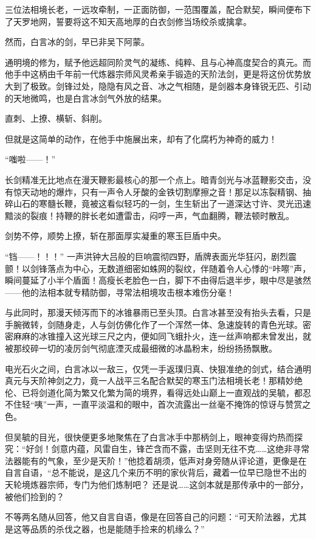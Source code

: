 三位法相境长老，一远攻牵制，一正面防御，一范围覆盖，配合默契，瞬间便布下了天罗地网，誓要将这不知天高地厚的白衣剑修当场绞杀或擒拿。

然而，白言冰的剑，早已非吴下阿蒙。

通明境的修为，赋予他远超同阶灵气的凝练、纯粹、且与心神高度契合的真元。而他手中这柄由千年前一代炼器宗师风灵希亲手锻造的天阶法剑，更是将这份优势放大到了极致。剑锋过处，隐隐有风之音、冰之气相随，是剑器本身锋锐无匹、引动的天地微鸣，也是白言冰剑气外放的结果。

直刺、上撩、横斩、斜削。

但就是这简单的动作，在他手中施展出来，却有了化腐朽为神奇的威力！

“嗤啦——！”

长剑精准无比地点在漫天鞭影最核心的那一个点上。暗青剑光与冰蓝鞭影交击，没有惊天动地的爆炸，只有一声令人牙酸的金铁切割摩擦之音！那足以冻裂精钢、抽碎山石的寒髓长鞭，竟被这看似轻巧的一剑，生生斩出了一道深达寸许、灵光迅速黯淡的裂痕！持鞭的胖长老如遭雷击，闷哼一声，气血翻腾，鞭法顿时散乱。

剑势不停，顺势上撩，斩在那面厚实凝重的寒玉巨盾中央。

“铛——！！！” 一声洪钟大吕般的巨响震彻四野，盾牌表面光华狂闪，剧烈震颤！以剑锋落点为中心，无数道细密如蛛网的裂纹，伴随着令人心悸的“咔嚓”声，瞬间蔓延了小半个盾面！高瘦长老脸色一白，脚下不由得后退半步，眼中尽是骇然——他的法相本就专精防御，寻常法相境攻击根本难伤分毫！

与此同时，那漫天倾泻而下的冰锥暴雨已至头顶。白言冰甚至没有抬头去看，只是手腕微转，剑随身走，人与剑仿佛化作了一个浑然一体、急速旋转的青色光球。密密麻麻的冰锥撞入这光球三尺之内，便如同飞蛾扑火，连一丝声响都未曾发出，就被那绞碎一切的凌厉剑气彻底湮灭成最细微的冰晶粉末，纷纷扬扬飘散。

电光石火之间，白言冰以一敌三，仅凭一手返璞归真、快狠准绝的剑式，结合通明真元与天阶神剑之力，竟一人战平三名配合默契的寒玉门法相境长老！那精妙绝伦、已将剑道化简为繁又化繁为简的境界，看得远处山巅上一直观战的吴毓，都忍不住轻“咦”一声，一直平淡温和的眼中，首次流露出一丝毫不掩饰的惊讶与赞赏之色。

但吴毓的目光，很快便更多地聚焦在了白言冰手中那柄剑上，眼神变得灼热而探究：“好剑！剑意内蕴，风雷自生，锋芒含而不露，击坚则无往不克……这绝非寻常法器能有的气象，至少是天阶！”他捻着胡须，低声对身旁随从评论道，更像是在自言自语，“总不能说，是这几个来历不明的家伙背后，藏着一位早已隐世不出的天轮境炼器宗师，专门为他们炼制吧？ 还是说……这剑本就是那传承中的一部分，被他们捡到的？

不等两名随从回答，他又自言自语，像是在回答自己的问题：“可天阶法器，尤其是这等品质的杀伐之器，也是能随手捡来的机缘么？”

